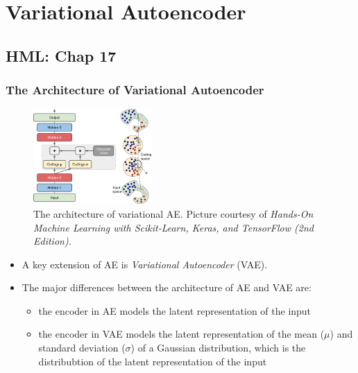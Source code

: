 \documentclass{beamer}
\begin{document}

\section{Variational Autoencoder}
\subsection{HML: Chap 17}
\begin{frame}
\setlength{\leftmargini}{0.3cm}
\setlength{\leftmarginii}{0.6cm}
\setlength{\leftmarginiii}{0.9cm}
\frametitle{The Architecture of Variational Autoencoder}
\begin{figure}[h!]
\centering
\includegraphics[width=0.4\textwidth]{./figure/vae}
\caption{The architecture of variational AE. Picture courtesy of \emph{Hands-On Machine Learning with Scikit-Learn, Keras, and TensorFlow (2nd Edition).}}\label{fig:vae}
\end{figure}
\vspace{-0.4cm}
\begin{itemize}
\footnotesize
\item A key extension of AE is \emph{Variational Autoencoder} (VAE).
\item The major differences between the architecture of AE and VAE are:
	\begin{itemize}
	\footnotesize
	\item the encoder in AE models the latent representation of the input
	\item the encoder in VAE models the latent representation of the mean ($\mu$) and standard deviation ($\sigma$) of a Gaussian distribution, which is the distribubtion of the latent representation of the input
	\end{itemize}
\end{itemize}
\end{frame}
\end{document}
